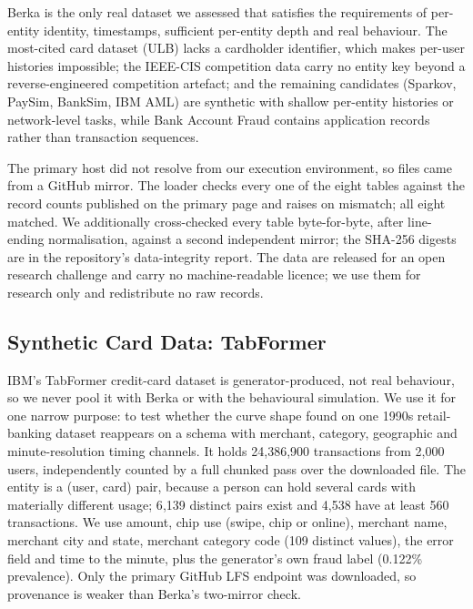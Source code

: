 Berka is the only real dataset we assessed that satisfies the requirements of per-entity identity, timestamps, sufficient per-entity depth and real behaviour. The most-cited card dataset (ULB) lacks a cardholder identifier, which makes per-user histories impossible; the IEEE-CIS competition data carry no entity key beyond a reverse-engineered competition artefact; and the remaining candidates (Sparkov, PaySim, BankSim, IBM AML) are synthetic with shallow per-entity histories or network-level tasks, while Bank Account Fraud contains application records rather than transaction sequences.

The primary host did not resolve from our execution environment, so files came from a GitHub mirror. The loader checks every one of the eight tables against the record counts published on the primary page and raises on mismatch; all eight matched. We additionally cross-checked every table byte-for-byte, after line-ending normalisation, against a second independent mirror; the SHA-256 digests are in the repository's data-integrity report. The data are released for an open research challenge and carry no machine-readable licence; we use them for research only and redistribute no raw records.

\subsection{Synthetic Card Data: TabFormer}
IBM's TabFormer credit-card dataset \cite{padhi2021tabular} is generator-produced, not real behaviour, so we never pool it with Berka or with the behavioural simulation. We use it for one narrow purpose: to test whether the curve shape found on one 1990s retail-banking dataset reappears on a schema with merchant, category, geographic and minute-resolution timing channels. It holds 24{,}386{,}900 transactions from 2{,}000 users, independently counted by a full chunked pass over the downloaded file. The entity is a (user, card) pair, because a person can hold several cards with materially different usage; 6{,}139 distinct pairs exist and 4{,}538 have at least 560 transactions. We use amount, chip use (swipe, chip or online), merchant name, merchant city and state, merchant category code (109 distinct values), the error field and time to the minute, plus the generator's own fraud label (0.122\% prevalence). Only the primary GitHub LFS endpoint was downloaded, so provenance is weaker than Berka's two-mirror check.

